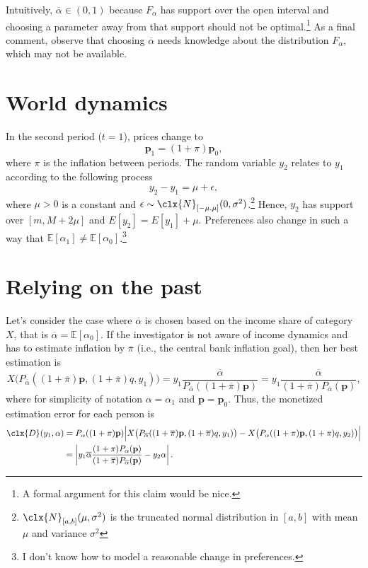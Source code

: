\documentclass[english, a4paper,12pt]{article}
\begin{document}
Intuitively, $\overline{\alpha} \in (0,1)$ because $F_{\alpha}$ has support over the open interval and choosing a parameter away from that support should not be optimal.\footnote{A formal argument for this claim would be nice.} As a final comment, observe that choosing $\overline{\alpha}$ needs knowledge about the distribution $F_{\alpha}$, which may not be available.

\section{World dynamics}
In the second period ($t = 1$), prices change to
	$$\mathbf{p}_{1} = (1+\pi)\mathbf{p}_{0},$$
where $\pi$ is the inflation between periods. The random variable $y_{2}$ relates to $y_{1}$ according to the following process
	$$y_{2} - y_{1} = \mu + \epsilon,$$
where $\mu > 0$ is a constant and $\epsilon \sim \clx{N}_{[-\mu, \mu]}(0, \sigma^{2})$.\footnote{$\clx{N}_{[a,b]}(\mu, \sigma^{2})$ is the truncated normal distribution in $[a,b]$ with mean $\mu$ and variance $\sigma^{2}$} Hence, $y_{2}$ has support over $[m,M+2\mu]$ and $E[y_{2}] = E[y_{1}] + \mu$. Preferences also change in such a way that $\mathbb{E}[\alpha_{1}] \neq \mathbb{E}[\alpha_{0}]$.\footnote{I don't know how to model a reasonable change in preferences.}

\section{Relying on the past}
Let's consider the case where $\overline{\alpha}$ is chosen based on the income share of category $X$, that is $\overline{\alpha} = \mathbb{E}[\alpha_{0}]$. If the investigator is not aware of income dynamics and has to estimate inflation by $\overline{\pi}$ (i.e., the central bank inflation goal), then her best estimation is
	$$X\big(P_{\overline{\alpha}}((1+\overline{\pi})\mathbf{p}, (1+\overline{\pi})q, y_{1})\big) 
		= y_{1}\frac{\overline{\alpha}}{P_{\overline{\alpha}}((1+\overline{\pi})\mathbf{p})}
		= y_{1}\frac{\overline{\alpha}}{(1+\overline{\pi})P_{\overline{\alpha}}(\mathbf{p})},
	$$
where for simplicity of notation $\alpha = \alpha_{1}$ and $\mathbf{p} = \mathbf{p}_{0}$. Thus, the monetized estimation error for each person is
	\begin{equation} \label{eq:differencenoincome}
	\begin{aligned}
		\clx{D}(y_{1}, \alpha) 
			&=	P_{\alpha}((1+\pi)\mathbf{p}) \Big| X\big(P_{\overline{\alpha}}((1+\overline{\pi})\mathbf{p}, (1+\overline{\pi})q, y_{1})\big) 
					- X\big(P_{\alpha}((1+\pi)\mathbf{p}, (1+\pi)q, y_{2})\big) \Big|	\\
			&=	\left| y_{1}\overline{\alpha}\frac{(1+\pi)P_{\alpha}(\mathbf{p})}{(1+\overline{\pi})P_{\overline{\alpha}}(\mathbf{p})} 
					- y_{2}\alpha \right|.
	\end{aligned}
	\end{equation}
\end{document}
